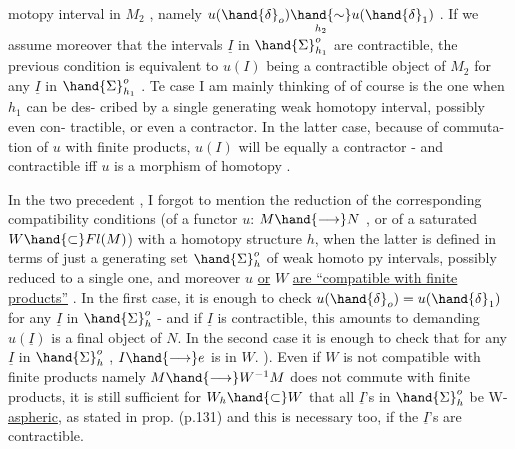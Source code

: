 motopy interval in $M_2$ , namely $u(\hand{\delta}_o) \underset{h_2}{\hand{\sim}} u(\hand{\delta}_1)$ . If we assume moreover
that the intervals $\underline{I}$ in $\hand{\Sigma}^o_{h_1}$ are contractible, the previous condition is
equivalent to $u(I)$ being a contractible object of $M_2$ for any $\underline{I}$ in $\hand{\Sigma}^o_{h_1}$ .
Te case I am mainly thinking of of course is the one when $h_1$ can be des-%
cribed by a single generating weak homotopy interval, possibly even con-%
tractible, or even  a  contractor. In the latter case, because of commuta-%
tion of $u$ with finite products, $u(I)$ will be equally a contractor - and
contractible  iff $u$ is a morphism of homotopy .

In the two precedent  , I forgot to mention the 
reduction of the corresponding compatibility conditions (of a functor $u$:
$M \hand{\longrightarrow} N$ , or of a saturated $W \hand{\subset} Fl(M)$) with a homotopy structure $h$, when
the latter is defined in terms of just a generating set $\hand{\Sigma}^o_h$ of weak homoto%
py intervals, possibly reduced to a single one, and moreover $u$ \uline{or} $W$
\margin{$\times$} \uline{are ``compatible with finite products''} . In the first case, it is enough
to check $u(\hand{\delta}_o)=u(\hand{\delta}_1)$ for any $\underline{I}$ in $\hand{\Sigma}^o_h$  - and if $\underline{I}$ is contractible,
this amounts to demanding $u(\underline{I})$ is a final object of $N$. In the second case
it is enough  to check that  for any $\underline{I}$ in $\hand{\Sigma}^o_h$ , $I \hand{\longrightarrow} e$ is in $W$.  
). Even if
$W$ is not  compatible with finite products namely $M \hand{\longrightarrow} W^{-1}M$ does not commute
with finite products, it is still sufficient 
 for $W_h \hand{\subset} W$ that all $\underline{I}$'s in $\hand{\Sigma}^o_h$ be W-\uline{aspheric},
\hand{(}as stated in prop. (p.131)\hand{)}\hand{,} and this is necessary too, if the $\underline{I}$'s are
contractible.

